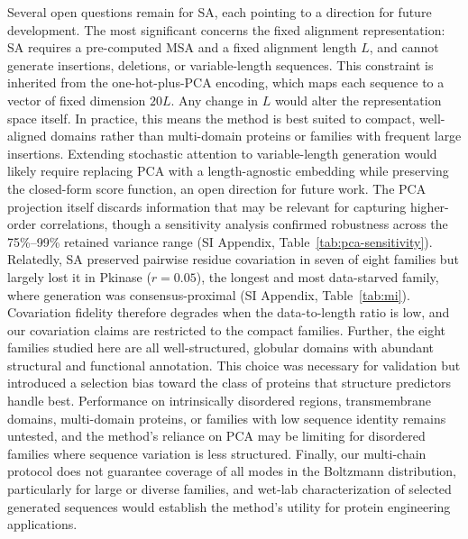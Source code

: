 Several open questions remain for SA, each pointing to a direction for future development. The most significant concerns the fixed alignment representation: SA requires a pre-computed MSA and a fixed alignment length $L$, and cannot generate insertions, deletions, or variable-length sequences. This constraint is inherited from the one-hot-plus-PCA encoding, which maps each sequence to a vector of fixed dimension $20L$. Any change in $L$ would alter the representation space itself. In practice, this means the method is best suited to compact, well-aligned domains rather than multi-domain proteins or families with frequent large insertions. Extending stochastic attention to variable-length generation would likely require replacing PCA with a length-agnostic embedding while preserving the closed-form score function, an open direction for future work. The PCA projection itself discards information that may be relevant for capturing higher-order correlations, though a sensitivity analysis confirmed robustness across the 75\%--99\% retained variance range (SI Appendix, Table~\ref{tab:pca-sensitivity}). Relatedly, SA preserved pairwise residue covariation in seven of eight families but largely lost it in Pkinase ($r{=}0.05$), the longest and most data-starved family, where generation was consensus-proximal (SI Appendix, Table~\ref{tab:mi}). Covariation fidelity therefore degrades when the data-to-length ratio is low, and our covariation claims are restricted to the compact families. Further, the eight families studied here are all well-structured, globular domains with abundant structural and functional annotation. This choice was necessary for validation but introduced a selection bias toward the class of proteins that structure predictors handle best. Performance on intrinsically disordered regions, transmembrane domains, multi-domain proteins, or families with low sequence identity remains untested, and the method's reliance on PCA may be limiting for disordered families where sequence variation is less structured. Finally, our multi-chain protocol does not guarantee coverage of all modes in the Boltzmann distribution, particularly for large or diverse families, and wet-lab characterization of selected generated sequences would establish the method's utility for protein engineering applications.
